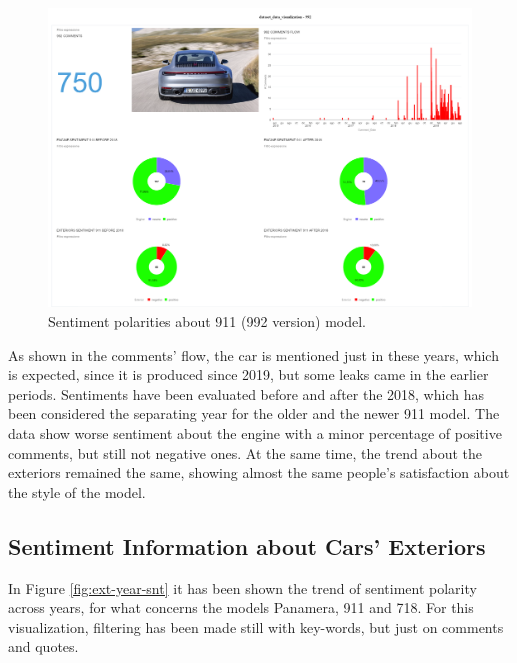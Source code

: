 \begin{figure}[H]
	\centering
	\includegraphics[width=\textwidth]{figures/odv_export/dataset_data_visualization_4.pdf}
	\caption{Sentiment polarities about 911 (992 version) model.}
	\label{fig:992-snt}
\end{figure}

As shown in the comments' flow, the car is mentioned just in these years, which is expected, since it is produced since 2019, but some leaks came in the earlier periods. Sentiments have been evaluated before and after the 2018, which has been considered the separating year for the older and the newer 911 model. The data show worse sentiment about the engine with a minor percentage of positive comments, but still not negative ones. At the same time, the trend about the exteriors remained the same, showing almost the same people's satisfaction about the style of the model.


\subsection{Sentiment Information about Cars' Exteriors}

In Figure \ref{fig:ext-year-snt} it has been shown the trend of sentiment polarity across years, for what concerns the models Panamera, 911 and 718. For this visualization, filtering has been made still with key-words, but just on comments and quotes.

